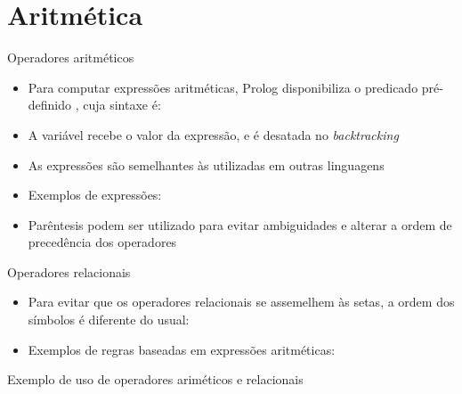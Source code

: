 \section{Aritmética}

\begin{frame}[fragile]{Operadores aritméticos}

    \begin{itemize}
        \item Para computar expressões aritméticas, Prolog disponibiliza o predicado 
            pré-definido , cuja sintaxe é:


        \item A variável  recebe o valor da expressão, e é desatada no 
            \textit{backtracking}

        \item As expressões são semelhantes às utilizadas em outras linguagens

        \item Exemplos de expressões:


        \item Parêntesis podem ser utilizado para evitar ambiguidades e alterar a ordem de 
            precedência dos operadores


    \end{itemize}

\end{frame}

\begin{frame}[fragile]{Operadores relacionais}

    \begin{itemize}
        \item Para evitar que os operadores relacionais se assemelhem às setas, a ordem dos 
            símbolos é diferente do usual:


        \item Exemplos de regras baseadas em expressões aritméticas:


    \end{itemize}

\end{frame}

\begin{frame}[fragile]{Exemplo de uso de operadores ariméticos e relacionais}


\end{frame}
